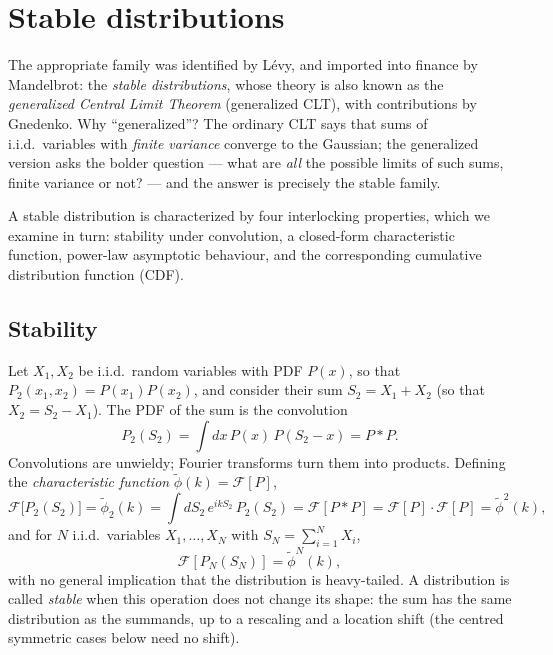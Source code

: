 \section{Stable distributions}\label{sec:stable-distributions}

The appropriate family was identified by L\'evy, and imported into finance by Mandelbrot: the \emph{stable distributions}, whose theory is also known as the \emph{generalized Central Limit Theorem} (generalized CLT), with contributions by Gnedenko.
Why ``generalized''?
The ordinary CLT says that sums of i.i.d.\ variables with \emph{finite variance} converge to the Gaussian; the generalized version asks the bolder question --- what are \emph{all} the possible limits of such sums, finite variance or not? --- and the answer is precisely the stable family.

A stable distribution is characterized by four interlocking properties, which we examine in turn: stability under convolution, a closed-form characteristic function, power-law asymptotic behaviour, and the corresponding cumulative distribution function (CDF).

\subsection{Stability}

Let $X_1, X_2$ be i.i.d.\ random variables with PDF $P(x)$, so that $P_2(x_1, x_2) = P(x_1)P(x_2)$, and consider their sum $S_2 = X_1 + X_2$ (so that $X_2 = S_2 - X_1$).
The PDF of the sum is the convolution
\begin{equation}
P_2(S_2) = \int dx\, P(x)\, P(S_2 - x) = P * P.
\end{equation}
Convolutions are unwieldy; Fourier transforms turn them into products.
Defining the \emph{characteristic function} $\tilde\phi(k)=\mathcal{F}[P]$,
\begin{equation}
\mathcal{F}\bigl[P_2(S_2)\bigr] = \tilde\phi_2(k) = \int dS_2\, e^{ikS_2}\, P_2(S_2) = \mathcal{F}[P*P] = \mathcal{F}[P]\cdot\mathcal{F}[P] = \tilde\phi^2(k),
\end{equation}
and for $N$ i.i.d.\ variables $X_1,\ldots,X_N$ with $S_N = \sum_{i=1}^{N} X_i$,
\begin{equation}
\mathcal{F}[P_N(S_N)] = \tilde\phi^N(k),
\end{equation}
with no general implication that the distribution is heavy-tailed.
A distribution is called \emph{stable} when this operation does not change its shape: the sum has the same distribution as the summands, up to a rescaling and a location shift (the centred symmetric cases below need no shift).

